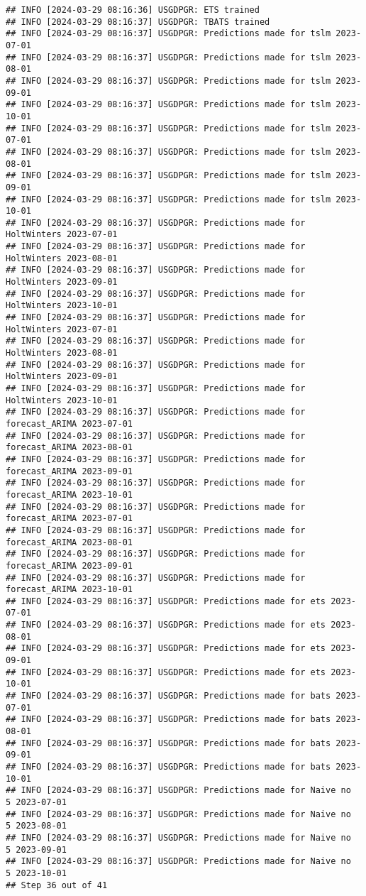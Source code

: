 \documentclass[
]{article}
\begin{document}
\begin{verbatim}
## INFO [2024-03-29 08:16:36] USGDPGR: ETS trained
## INFO [2024-03-29 08:16:37] USGDPGR: TBATS trained
## INFO [2024-03-29 08:16:37] USGDPGR: Predictions made for tslm 2023-07-01
## INFO [2024-03-29 08:16:37] USGDPGR: Predictions made for tslm 2023-08-01
## INFO [2024-03-29 08:16:37] USGDPGR: Predictions made for tslm 2023-09-01
## INFO [2024-03-29 08:16:37] USGDPGR: Predictions made for tslm 2023-10-01
## INFO [2024-03-29 08:16:37] USGDPGR: Predictions made for tslm 2023-07-01
## INFO [2024-03-29 08:16:37] USGDPGR: Predictions made for tslm 2023-08-01
## INFO [2024-03-29 08:16:37] USGDPGR: Predictions made for tslm 2023-09-01
## INFO [2024-03-29 08:16:37] USGDPGR: Predictions made for tslm 2023-10-01
## INFO [2024-03-29 08:16:37] USGDPGR: Predictions made for HoltWinters 2023-07-01
## INFO [2024-03-29 08:16:37] USGDPGR: Predictions made for HoltWinters 2023-08-01
## INFO [2024-03-29 08:16:37] USGDPGR: Predictions made for HoltWinters 2023-09-01
## INFO [2024-03-29 08:16:37] USGDPGR: Predictions made for HoltWinters 2023-10-01
## INFO [2024-03-29 08:16:37] USGDPGR: Predictions made for HoltWinters 2023-07-01
## INFO [2024-03-29 08:16:37] USGDPGR: Predictions made for HoltWinters 2023-08-01
## INFO [2024-03-29 08:16:37] USGDPGR: Predictions made for HoltWinters 2023-09-01
## INFO [2024-03-29 08:16:37] USGDPGR: Predictions made for HoltWinters 2023-10-01
## INFO [2024-03-29 08:16:37] USGDPGR: Predictions made for forecast_ARIMA 2023-07-01
## INFO [2024-03-29 08:16:37] USGDPGR: Predictions made for forecast_ARIMA 2023-08-01
## INFO [2024-03-29 08:16:37] USGDPGR: Predictions made for forecast_ARIMA 2023-09-01
## INFO [2024-03-29 08:16:37] USGDPGR: Predictions made for forecast_ARIMA 2023-10-01
## INFO [2024-03-29 08:16:37] USGDPGR: Predictions made for forecast_ARIMA 2023-07-01
## INFO [2024-03-29 08:16:37] USGDPGR: Predictions made for forecast_ARIMA 2023-08-01
## INFO [2024-03-29 08:16:37] USGDPGR: Predictions made for forecast_ARIMA 2023-09-01
## INFO [2024-03-29 08:16:37] USGDPGR: Predictions made for forecast_ARIMA 2023-10-01
## INFO [2024-03-29 08:16:37] USGDPGR: Predictions made for ets 2023-07-01
## INFO [2024-03-29 08:16:37] USGDPGR: Predictions made for ets 2023-08-01
## INFO [2024-03-29 08:16:37] USGDPGR: Predictions made for ets 2023-09-01
## INFO [2024-03-29 08:16:37] USGDPGR: Predictions made for ets 2023-10-01
## INFO [2024-03-29 08:16:37] USGDPGR: Predictions made for bats 2023-07-01
## INFO [2024-03-29 08:16:37] USGDPGR: Predictions made for bats 2023-08-01
## INFO [2024-03-29 08:16:37] USGDPGR: Predictions made for bats 2023-09-01
## INFO [2024-03-29 08:16:37] USGDPGR: Predictions made for bats 2023-10-01
## INFO [2024-03-29 08:16:37] USGDPGR: Predictions made for Naive no  5 2023-07-01
## INFO [2024-03-29 08:16:37] USGDPGR: Predictions made for Naive no  5 2023-08-01
## INFO [2024-03-29 08:16:37] USGDPGR: Predictions made for Naive no  5 2023-09-01
## INFO [2024-03-29 08:16:37] USGDPGR: Predictions made for Naive no  5 2023-10-01
## Step 36 out of 41
\end{verbatim}
\end{document}
